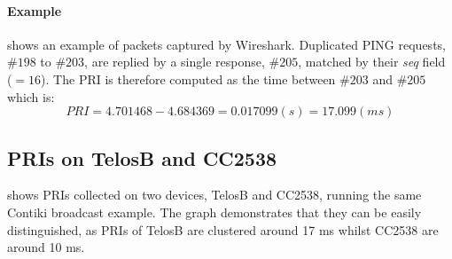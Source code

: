 \paragraph{Example}


 shows an example of packets captured by Wireshark\cite{Wireshark}. Duplicated PING requests, \#$198$ to \#$203$, are replied by a single response, \#$205$, matched by their \textit{seq} field ($=16$). The PRI is therefore computed as the time between \#$203$ and \#$205$ which is:
\begin{equation*}
PRI = 4.701468 - 4.684369 = 0.017099(s) = 17.099(ms)
\end{equation*}

\subsection{PRIs on TelosB and CC2538} \label{PRI_Devices}

 shows PRIs collected on two devices, TelosB and CC2538, running the same Contiki broadcast example. The graph demonstrates that they can be easily distinguished, as PRIs of TelosB are clustered around 17 ms whilst CC2538 are around  10 ms.

